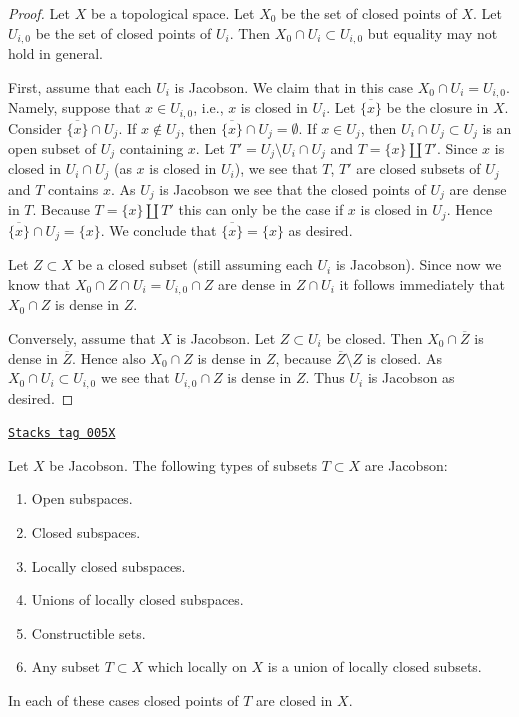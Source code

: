 \begin{proof}
Let $X$ be a topological space.
Let $X_0$ be the set of closed points of $X$.
Let $U_{i, 0}$ be the set of closed points of
$U_i$. Then $X_0 \cap U_i \subset U_{i, 0}$
but equality may not hold in general.

\medskip\noindent
First, assume that each $U_i$ is Jacobson.
We claim that in this case $X_0 \cap U_i = U_{i, 0}$.
Namely, suppose that $x \in U_{i, 0}$, i.e., $x$ is closed in
$U_i$. Let $\overline{\{x\}}$ be the closure
in $X$. Consider $\overline{\{x\}} \cap U_j$.
If $x \not \in U_j$, then $\overline{\{x\}} \cap U_j = \emptyset$.
If $x \in U_j$, then $U_i \cap U_j \subset U_j$
is an open subset of $U_j$ containing $x$.
Let $T' = U_j \setminus U_i \cap U_j$ and
$T = \{x\} \amalg T'$. Since $x$ is closed in $U_i \cap U_j$
(as $x$ is closed in $U_i$), we see that $T$, $T'$
are closed subsets of $U_j$ and $T$ contains
$x$. As $U_j$ is Jacobson we see that the closed points of
$U_j$ are dense in $T$. Because $T = \{x\} \amalg T'$
this can only be the case if $x$ is closed in $U_j$.
Hence $\overline{\{x\}} \cap U_j = \{x\}$. We conclude
that $\overline{\{x\}} = \{ x \}$ as desired.

\medskip\noindent
Let $Z \subset X$ be a closed subset (still
assuming each $U_i$ is Jacobson).
Since now we know that $X_0 \cap Z  \cap U_i
= U_{i, 0} \cap Z$ are dense in $Z \cap U_i$
it follows immediately that $X_0 \cap Z$ is
dense in $Z$.

\medskip\noindent
Conversely, assume that $X$ is Jacobson.
Let $Z \subset U_i$ be closed. Then
$X_0 \cap \overline{Z}$ is dense in $\overline{Z}$.
Hence also $X_0 \cap Z$ is dense in $Z$, because
$\overline{Z} \setminus Z$ is closed. As $X_0 \cap U_i
\subset U_{i, 0}$ we see that
$U_{i, 0} \cap Z$ is dense in $Z$.
Thus $U_i$ is Jacobson as desired.
\end{proof}

\begin{lemma}
\label{topology-lemma-jacobson-inherited}
\href{https://stacks.math.columbia.edu/tag/005X}{\texttt{Stacks tag 005X}}

Let $X$ be Jacobson. The following types of subsets $T \subset X$
are Jacobson:
\begin{enumerate}
\item Open subspaces.
\item Closed subspaces.
\item Locally closed subspaces.
\item Unions of locally closed subspaces.
\item Constructible sets.
\item Any subset $T \subset X$ which locally on $X$
is a union of locally closed subsets.
\end{enumerate}
In each of these cases closed points of $T$ are
closed in $X$.
\end{lemma}

